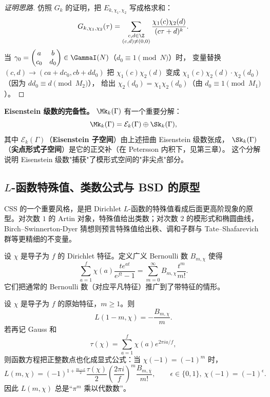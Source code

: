 \begin{proof}[证明思路]
仿照 $G_k$ 的证明，把 $E_{k,\chi_1,\chi_2}$ 写成格求和：
\[
  G_{k,\chi_1,\chi_2}(\tau)
  = \sum_{\substack{c,d \in \Z \\ (c,d) \neq (0,0)}}
    \frac{\chi_1(c)\chi_2(d)}{(c\tau + d)^k}.
\]
当 $\gamma_0 = \begin{pmatrix} a & b \\ c_0 & d_0 \end{pmatrix} \in \GammaI(N)$（$d_0 \equiv 1 \pmod N$）时，
变量替换 $(c,d) \to (ca + dc_0, cb + dd_0)$ 把 $\chi_1(c)\chi_2(d)$ 变成
$\chi_1(c)\chi_2(d) \cdot \chi_2(d_0)$（因为 $dd_0 \equiv d \pmod{M_2}$），
给出 $\chi_2(d_0) = \chi_1\chi_2(d_0)$（由 $d_0 \equiv 1 \pmod{M_1}$）。
\end{proof}

\textbf{Eisenstein 级数的完备性。}
$\Mk_k(\Gamma)$ 有一个重要分解：
\[
  \Mk_k(\Gamma) = \mathcal{E}_k(\Gamma) \oplus \Sk_k(\Gamma),
\]
其中 $\mathcal{E}_k(\Gamma)$（\textbf{Eisenstein 子空间}）由上述扭曲 Eisenstein 级数张成，
$\Sk_k(\Gamma)$（\textbf{尖点形式子空间}）是它的正交补（在 Petersson 内积下，见第三章）。
这个分解说明 Eisenstein 级数"捕获"了模形式空间的"非尖点"部分。

\subsection*{$L$-函数特殊值、类数公式与 BSD 的原型}

CSS 的一个重要风格，是把 Dirichlet $L$-函数的特殊值看成后面更高阶现象的原型。对次数 $1$ 的 Artin 对象，特殊值给出类数；对次数 $2$ 的模形式和椭圆曲线，Birch--Swinnerton-Dyer 猜想则预言特殊值给出秩、调和子群与 Tate--Shafarevich 群等更精细的不变量。

\begin{definition}[广义 Bernoulli 数]
\label{def:generalized-bernoulli}
设 $\chi$ 是导子为 $f$ 的 Dirichlet 特征。定义广义 Bernoulli 数 $B_{m,\chi}$ 使得
\[
  \sum_{a=1}^{f}\chi(a)\frac{te^{at}}{e^{ft}-1}
  = \sum_{m=0}^{\infty} B_{m,\chi}\frac{t^m}{m!}.
\]
它们把通常的 Bernoulli 数（对应平凡特征）推广到了带特征的情形。
\end{definition}

\begin{proposition}
\label{prop:dirichlet-special-values}
设 $\chi$ 是导子为 $f$ 的原始特征，$m\ge 1$。则
\[
  L(1-m,\chi)=-\frac{B_{m,\chi}}{m}.
\]
若再记 Gauss 和
\[
  \tau(\chi)=\sum_{a=1}^{f}\chi(a)e^{2\pi ia/f},
\]
则函数方程把正整数点也化成显式公式：当 $\chi(-1)=(-1)^m$ 时，
\[
  L(m,\chi)
  =(-1)^{1+\frac{m-\epsilon}{2}}\frac{\tau(\chi)}{2}
   \left(\frac{2\pi i}{f}\right)^m
   \frac{B_{m,\overline{\chi}}}{m!},
  \qquad \epsilon\in\{0,1\},\ \chi(-1)=(-1)^\epsilon.
\]
因此 $L(m,\chi)$ 总是“$\pi^m$ 乘以代数数”。
\end{proposition}

